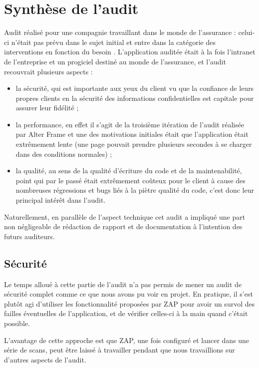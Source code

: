 \section{Synthèse de l'audit}
\label{sec:synthese_audit}
Audit réalisé pour une compagnie travaillant dans le monde de l'assurance : celui-ci n'était pas prévu dans le sujet initial et entre dans la catégorie des \og interventions en fonction du besoin \fg. L'application auditée était à la fois l'intranet de l'entreprise et un progiciel destiné au monde de l'assurance, et l'audit recouvrait plusieurs aspects :
\begin{itemize}
  \item la sécurité, qui est importante aux yeux du client vu que la confiance de leurs propres clients en la sécurité des informations confidentielles est capitale pour assurer leur fidélité ;
  \item la performance, en effet il s'agit de la troisième itération de l'audit réalisée par Alter Frame et une des motivations initiales était que l'application était extrêmement lente (une page pouvait prendre plusieurs secondes à se charger dans des conditions normales) ;
  \item la qualité, au sens de la qualité d'écriture du code et de la maintenabilité, point qui par le passé était extrêmement coûteux pour le client à cause des nombreuses régressions et bugs liés à la piètre qualité du code, c'est donc leur principal intérêt dans l'audit. 
\end{itemize}

Naturellement, en parallèle de l'aspect technique cet audit a impliqué une part non négligeable de rédaction de rapport et de documentation à l'intention des futurs auditeurs.

\subsection{Sécurité}
Le temps alloué à cette partie de l'audit n'a pas permis de mener un audit de sécurité complet comme ce que nous avons pu voir en projet. En pratique, il s'est plutôt agi d'utiliser les fonctionnalité proposées par ZAP pour avoir un survol des failles éventuelles de l'application, et de vérifier celles-ci \og à la main \fg quand c'était possible. 

L'avantage de cette approche est que ZAP, une fois configuré et lancer dans une série de scans, peut être laissé à travailler pendant que nous travaillions sur d'autres aspects de l'audit. 

